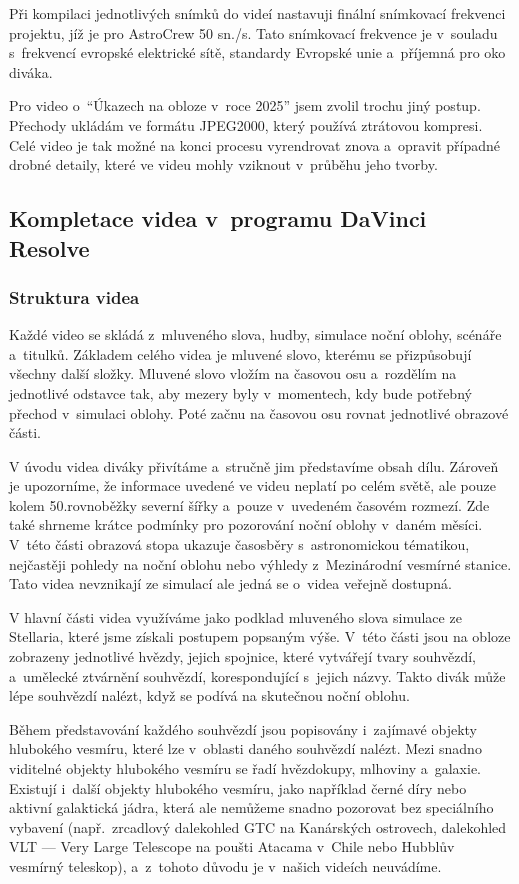 \documentclass[12pt,a4paper,titlepage]{article}
\begin{document}
Při kompilaci jednotlivých snímků do videí nastavuji finální snímkovací frekvenci projektu, jíž je pro AstroCrew 50 sn./s. Tato snímkovací frekvence je v~souladu s~frekvencí evropské elektrické sítě, standardy Evropské unie a~příjemná pro oko diváka.

Pro video o~\enquote{Úkazech na obloze v~roce 2025} jsem zvolil trochu jiný postup. Přechody ukládám ve formátu JPEG2000, který používá ztrátovou kompresi. Celé video je tak možné na konci procesu vyrendrovat znova a~opravit případné drobné detaily, které ve videu mohly vziknout v~průběhu jeho tvorby.
\subsection{Kompletace videa v~programu DaVinci Resolve}\label{makingof:resolve}
\subsubsection{Struktura videa}\label{makingof:resolve:structure}
Každé video se skládá z~mluveného slova, hudby, simulace noční oblohy, scénáře a~titulků. Základem celého videa je mluvené slovo, kterému se přizpůsobují všechny další složky. Mluvené slovo vložím na časovou osu a~rozdělím na jednotlivé odstavce tak, aby mezery byly v~momentech, kdy bude potřebný přechod v~simulaci oblohy. Poté začnu na časovou osu rovnat jednotlivé obrazové části.

V úvodu videa diváky přivítáme a~stručně jim představíme obsah dílu. Zároveň je upozorníme, že informace uvedené ve videu neplatí po celém světě, ale pouze kolem 50.\@ rovnoběžky severní šířky a~pouze v~uvedeném časovém rozmezí. Zde také shrneme krátce podmínky pro pozorování noční oblohy v~daném měsíci. V~této části obrazová stopa ukazuje časosběry s~astronomickou tématikou, nejčastěji pohledy na noční oblohu nebo výhledy z~Mezinárodní vesmírné stanice. Tato videa nevznikají ze simulací ale jedná se o~videa veřejně dostupná.

V hlavní části videa využíváme jako podklad mluveného slova simulace ze Stellaria, které jsme získali postupem popsaným výše. V~této části jsou na obloze zobrazeny jednotlivé hvězdy, jejich spojnice, které vytvářejí tvary souhvězdí, a~umělecké ztvárnění souhvězdí, korespondující s~jejich názvy. Takto divák může lépe souhvězdí nalézt, když se podívá na skutečnou noční oblohu. 

Během představování každého souhvězdí jsou popisovány i~zajímavé objekty hlubokého vesmíru, které lze v~oblasti daného souhvězdí nalézt. Mezi snadno viditelné objekty hlubokého vesmíru se řadí hvězdokupy, mlhoviny a~galaxie. Existují i~další objekty hlubokého vesmíru, jako například černé díry nebo aktivní galaktická jádra, která ale nemůžeme snadno pozorovat bez speciálního vybavení (např.\ zrcadlový dalekohled GTC na Kanárských ostrovech, dalekohled VLT --- Very Large Telescope na poušti Atacama v~Chile nebo Hubblův vesmírný teleskop), a~z~tohoto důvodu je v~našich videích neuvádíme.
\end{document}
